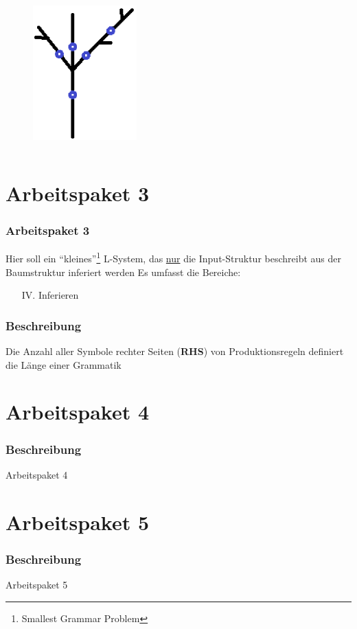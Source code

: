 \documentclass[12pt]{beamer}
\begin{document}
\begin{frame}
\begin{columns}
            \begin{column}{0.5\textwidth}
                \begin{figure}
                    \centering
                    \includegraphics[width=4cm]{../images/Tree_1.PNG}
                \end{figure}
            \end{column}
        \end{columns}

    \end{frame}

    \section{Arbeitspaket 3}
    \label{sec:3}

    \begin{frame}
        \frametitle{Arbeitspaket 3}
        Hier soll ein "`kleines"'\footnote{Smallest Grammar Problem} L-System, das \underline{nur} die Input-Struktur beschreibt aus der
        Baumstruktur
        inferiert werden Es umfasst die Bereiche:
        \begin{itemize}
            \item[IV.] Inferieren
        \end{itemize}
    \end{frame}

    \begin{frame}
        \frametitle{Beschreibung}
        Die Anzahl aller Symbole rechter Seiten (\textbf{RHS}) von Produktionsregeln definiert die Länge einer Grammatik
    \end{frame}

    \section{Arbeitspaket 4}
    \label{sec:4}

    \begin{frame}
        \frametitle{Beschreibung}
        Arbeitspaket 4
    \end{frame}

    \section{Arbeitspaket 5}
    \label{sec:5}

    \begin{frame}
        \frametitle{Beschreibung}
        Arbeitspaket 5
    \end{frame}
\end{document}
